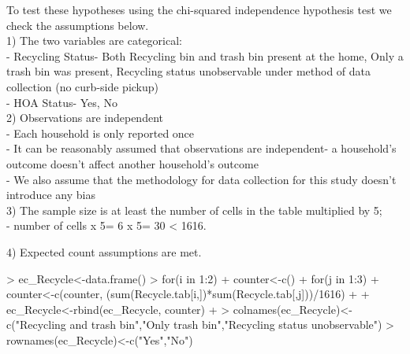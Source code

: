 \documentclass{article}
\begin{document}
To test these hypotheses using the chi-squared independence hypothesis test we check the assumptions below. \\

1) The two variables are categorical:\\
- Recycling Status- Both Recycling bin and trash bin present at the home, Only a trash bin was present, Recycling status unobservable under method of data collection (no curb-side pickup)\\
- HOA Status- Yes, No\\

2) Observations are independent\\
- Each household is only reported once\\
- It can be reasonably assumed that observations are independent- a household's outcome doesn't affect another household's outcome\\
- We also assume that the methodology for data collection for this study doesn't introduce any bias\\

3) The sample size is at least the number of cells in the table multiplied by 5;\\
- number of cells x 5= 6 x 5= 30 < 1616.

4) Expected count assumptions are met.

\begin{Schunk}
\begin{Sinput}
> ec_Recycle<-data.frame()
> for(i in 1:2){
+   counter<-c()
+   for(j in 1:3){
+     counter<-c(counter, (sum(Recycle.tab[i,])*sum(Recycle.tab[,j]))/1616)
+   }
+   ec_Recycle<-rbind(ec_Recycle, counter)
+ }
> colnames(ec_Recycle)<-c("Recycling and trash bin","Only trash bin","Recycling status unobservable")
> rownames(ec_Recycle)<-c("Yes","No")
\end{Sinput}
\end{Schunk}
\end{document}
